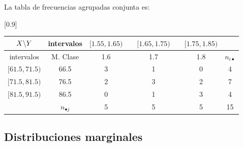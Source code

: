 \begin{frame}

La tabla de frecuencias agrupadas conjunta es:

\begin{center}
\scalebox{0.9}[0.9]{
\begin{tabular}{|c|c|ccccc|c|}
\cline{1-7} $X  \mbox{\mbox{\textbackslash}}Y$ & intervalos & \multicolumn{1}{c}{$[1.55,1.65)$} &\vrule &
\multicolumn{1}{c}{$[1.65, 1.75)$} &\vrule &
 \multicolumn{1}{c|}{$[1.75, 1.85)$} &\multicolumn{1}{c}{}\\
\hline intervalos& M. Clase & \multicolumn{1}{c}{1.6} &\vrule & \multicolumn{1}{c}{1.7} &
\vrule & \multicolumn{1}{c|}{1.8} & $n_{i\bullet}$ \\
 \hline
$[61.5, 71.5)$ & 66.5 & 3 && 1 && 0 & 4 \\ $[71.5, 81.5)$ & 76.5 & 2 && 3 && 2 & 7 \\
$[81.5, 91.5)$ & 86.5 & 0 && 1 && 3 & 4 \\ \hline \multicolumn{1}{c|}{} & $n_{\bullet j}$
& 5 && 5 && 5 & 15 \\ \cline{2-8}
\end{tabular}
}
\end{center}
\end{frame}

\subsection{Distribuciones marginales}



